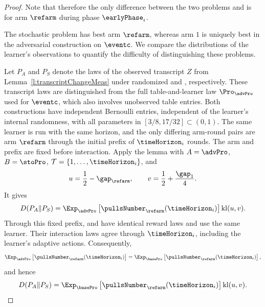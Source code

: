 \begin{proof}
	Note that therefore the only difference between the two problems 
	\stoPro{} and \advPro{} is for  arm $\refarm$ during phase $\earlyPhase_i$.
	
	
The stochastic problem has best arm $\refarm$, whereas arm $1$ is
uniquely best in the adversarial construction on $\eventc$.
We compare the distributions of the learner's observations to quantify
the difficulty of distinguishing these problems.

Let $P_A$ and $P_S$ denote the laws of the observed transcript $Z$
from Lemma~\ref{l:transcriptChangeMeas} under randomized \advPro{}
and \stoPro{}, respectively. These transcript laws are distinguished
from the full table-and-learner law $\Pro_{\advPro}$ used for $\eventc$,
which also involves unobserved table entries.
Both constructions have independent Bernoulli entries, independent
of the learner's internal randomness, with all parameters in
$[3/8,17/32]\subset(0,1)$. The same learner is run with the same
horizon, and the only differing arm-round pairs are arm $\refarm$
through the initial prefix of $\timeHorizon_i$ rounds.
The arm and prefix are fixed before interaction.
Apply the lemma with $A=\advPro$, $B=\stoPro$,
$\mathcal T=\{1,\ldots,\timeHorizon_i\}$, and
\[
u=\frac12-\gap_{\refarm},\qquad v=\frac12+\frac{\gap_1}{4}.
\]
It gives
\[
D(P_A\Vert P_S)
=\Exp_{\advPro}\left[\pullsNumber_{\refarm}(\timeHorizon_i)\right]
\operatorname{kl}(u,v).
\]
Through this fixed prefix, \advPro{} and \basePro{} have identical
reward laws and use the same learner. Their interaction laws agree
through $\timeHorizon_i$, including the learner's adaptive actions.
Consequently,
\[
\Exp_{\advPro}\left[\pullsNumber_{\refarm}(\timeHorizon_i)\right]
=\Exp_{\basePro}\left[\pullsNumber_{\refarm}(\timeHorizon_i)\right],
\]
and hence
\[
D(P_A\Vert P_S)
=\Exp_{\basePro}\left[\pullsNumber_{\refarm}(\timeHorizon_i)\right]
\operatorname{kl}(u,v).
\]


\end{proof}
